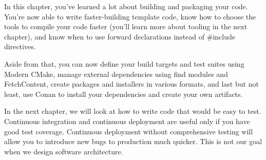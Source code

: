 In this chapter, you've learned a lot about building and packaging your code. You're now able to write faster-building template code, know how to choose the tools to compile your code faster (you'll learn more about tooling in the next chapter), and know when to use forward declarations instead of \#include directives.

Aside from that, you can now define your build targets and test suites using Modern CMake, manage external dependencies using find modules and FetchContent, create packages and installers in various formats, and last but not least, use Conan to install your dependencies and create your own artifacts.

In the next chapter, we will look at how to write code that would be easy to test. Continuous integration and continuous deployment are useful only if you have good test coverage. Continuous deployment without comprehensive testing will allow you to introduce new bugs to production much quicker. This is not our goal when we design software architecture.